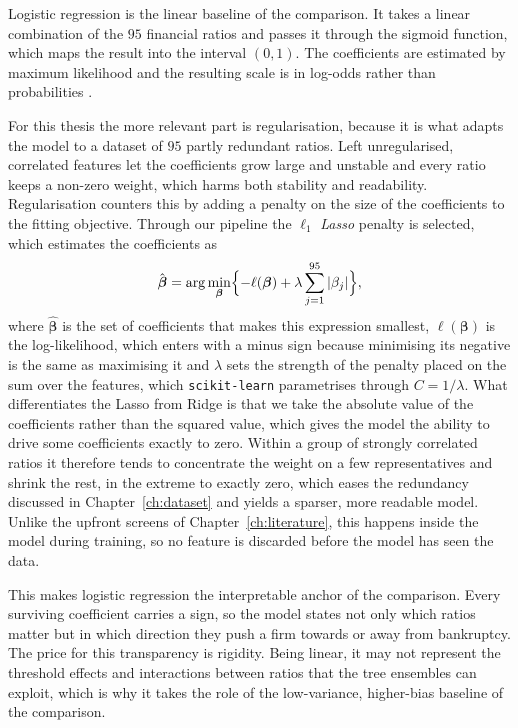 Logistic regression is the linear baseline of the comparison. It takes a linear 
combination of the $95$ financial ratios and passes it
through the sigmoid function, which maps the result into the interval
$(0,1)$. The coefficients are estimated by maximum likelihood 
and the resulting scale is in log-odds rather than probabilities
\parencite[p. 138]{islp2023}.

For this thesis the more relevant part is regularisation, because it
is what adapts the model to a dataset of $95$ partly redundant ratios. Left
unregularised, correlated features let the coefficients grow large and unstable
and every ratio keeps a non-zero weight, which harms both stability and
readability. Regularisation counters this by adding a penalty on the size of the
coefficients to the fitting objective. Through our pipeline the $\ell_1$
\emph{Lasso} penalty \parencite{tibshirani1996} is selected, which estimates the 
coefficients as
\begin{equation}
  \hat{\boldsymbol{\beta}}
  = \arg\min_{\boldsymbol{\beta}}
    \Bigl\{ -\ell(\boldsymbol{\beta}) + \lambda \sum_{j=1}^{95} |\beta_j| \Bigr\},
  \label{eq:lasso}
\end{equation}
where $\hat{\boldsymbol{\beta}}$ is the set of coefficients that makes this
expression smallest, $\ell(\boldsymbol{\beta})$ is the log-likelihood, which enters with
a minus sign because minimising its negative is the same as maximising it and
$\lambda$ sets the strength of the penalty placed on the sum over the features,
which \texttt{scikit-learn} parametrises through $C = 1/\lambda$. What 
differentiates the Lasso from Ridge is that we take the absolute value of
the coefficients rather than the squared value, which gives the model the
ability to drive some coefficients exactly to zero. Within a group of strongly
correlated ratios it therefore tends to concentrate the weight on a few
representatives and shrink the rest, in the extreme to exactly zero, which
eases the redundancy discussed in Chapter~\ref{ch:dataset} and yields a
sparser, more readable model. Unlike the upfront screens of
Chapter~\ref{ch:literature}, this happens inside the model during training, so
no feature is discarded before the model has seen the data.

This makes logistic regression the interpretable anchor of the comparison. Every
surviving coefficient carries a sign, so the model states not only which ratios
matter but in which direction they push a firm towards or away from bankruptcy. 
The price for this transparency is rigidity. Being linear, it may not represent the threshold effects and
interactions between ratios that the tree ensembles can exploit, which is why it takes
the role of the low-variance, higher-bias baseline of the comparison.

